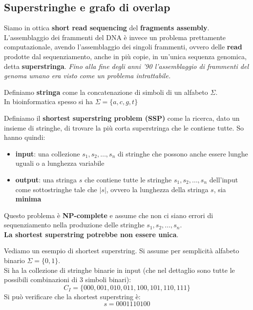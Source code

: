 \documentclass[a4paper,12pt, oneside]{book}
\begin{document}
\subsection{Superstringhe e grafo di overlap}
Siamo in ottica \textbf{short read sequencing} del \textbf{fragments
  assembly}.\\ 
L'assemblaggio dei frammenti del DNA è invece un problema prettamente
computazionale, avendo l'assemblaggio dei singoli frammenti, ovvero delle
\textbf{read} prodotte dal sequenziamento, anche in più copie, in un'unica
sequenza genomica, detta \textbf{superstringa}. \textit{Fino alla fine degli
  anni '90 l'assemblaggio di frammenti del genoma umano era visto come un
  problema intrattabile.}
\begin{definizione}
  Definiamo \textbf{stringa} come la concatenazione di simboli di un alfabeto
  $\Sigma$.\\
  In bioinformatica spesso si ha $\Sigma=\{a,c,g,t\}$
\end{definizione}
\begin{definizione}
  Definiamo il \textbf{shortest superstring problem (SSP)} come la ricerca,
  dato un insieme di stringhe, di trovare la più corta superstringa che le
  contiene tutte. So hanno quindi:
  \begin{itemize}
    \item \textbf{input}: una collezione $s_1,s_2,\ldots,s_n$ di stringhe che
    possono anche essere lunghe uguali o a lunghezza variabile
    \item \textbf{output}: una stringa $s$ che contiene tutte le stringhe
    $s_1,s_2,\ldots,s_n$ dell'input come sottostringhe tale che $|s|$, ovvero la
    lunghezza della stringa $s$, sia \textbf{minima}
  \end{itemize}
  Questo problema è \textbf{NP-complete} e assume che non ci siano errori di
  sequenziamento nella produzione delle stringhe $s_1,s_2,\ldots,s_n$.\\
  \textbf{La shortest superstring potrebbe non essere unica}.
\end{definizione}
\begin{esempio}
  Vediamo un esempio di shortest superstring. Si assume per semplicità alfabeto
  binario $\Sigma=\{0,1\}$.\\
  Si ha la collezione di stringhe binarie in input (che nel dettaglio sono tutte
  le possibili combinazioni di 3 simboli binari):
  \[C_I=\{000,001,010,011,100,101,110,111\}\]
  Si può verificare che la shortest superstring è:
  \[s=0001110100\]
\end{esempio}
\end{document}
